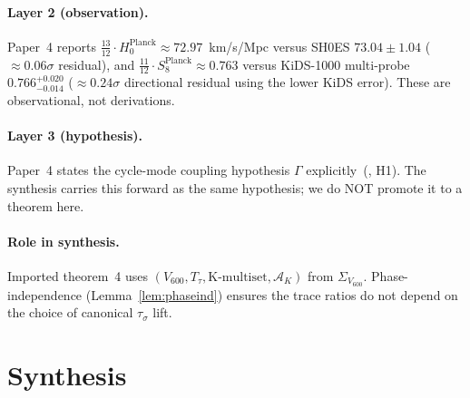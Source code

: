 \documentclass[11pt]{article}
\theoremstyle{remark}
\newcommand{\Vsixhundred}{V_{600}}
\newcommand{\Sigmaspine}{\Sigma_{\Vsixhundred}}
\newcommand{\Ttau}{T_{\tau}}
\newcommand{\tausigma}{\tau_\sigma}
\newcommand{\AK}{\mathcal{A}_K}
\newcommand{\Hzero}{H_0}
\begin{document}
\paragraph{Layer 2 (observation).}
Paper~4 reports
$\frac{13}{12} \cdot \Hzero^{\mathrm{Planck}} \approx 72.97$~km/s/Mpc
versus SH0ES $73.04 \pm 1.04$ ($\approx 0.06\sigma$ residual), and
$\frac{11}{12} \cdot S_8^{\mathrm{Planck}} \approx 0.763$ versus
KiDS-1000 multi-probe $0.766^{+0.020}_{-0.014}$
($\approx 0.24\sigma$ directional residual using the lower KiDS
error). These are observational, not derivations.

\paragraph{Layer 3 (hypothesis).}
Paper~4 states the cycle-mode coupling hypothesis $\Gamma$
explicitly~(\citealp{V600Paper4}, H1). The synthesis carries this
forward as the same hypothesis; we do NOT promote it to a theorem
here.

\paragraph{Role in synthesis.}
Imported theorem~4 uses $(\Vsixhundred, \Ttau, \mathrm{K\text{-multiset}},
\AK)$ from $\Sigmaspine$. Phase-independence
(Lemma~\ref{lem:phaseind}) ensures the trace ratios do not depend on
the choice of canonical $\tausigma$ lift.

\section{Synthesis}\label{sec:synthesis}
\end{document}
